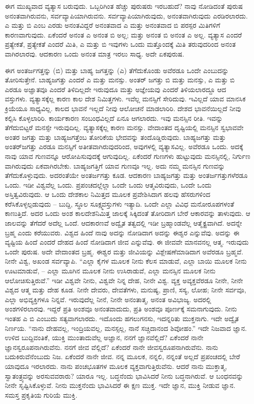 ಈಗ ಮುಖ್ಯವಾದ ವ್ಯತ್ಯಾಸ ಬರುವುದು. ಒಬ್ಬರಿಗಿಂತ ಹೆಚ್ಚು ಪುರುಷರು ಇರಬಹುದೆ? ನಾವು ನೋಡಿದಂತೆ ಪುರುಷ ಅನಂತವಾಗಿರುವನು, ಸರ್ವವ್ಯಾಪಿಯಾಗಿರುವನು. ಸರ್ವವ್ಯಾಪಿಯಾಗಿರುವುದು, ಅನಂತವಾಗಿರುವುದು ಎರಡಿರಲಾರದು. ಎ ಮತ್ತು ಬಿ ಎಂಬ ಎರಡು ಅನಂತವಿದ್ದರೆ ಅನಂತವಾದ ಎ ಮತ್ತು ಅನಂತವಾದ ಬಿ ಪರಸ್ಪರ ಮಿತಿಗಳಿಗೆ ಕಾರಣವಾಗುವುದು. ಏಕೆಂದರೆ ಅನಂತ ಎ ಅನಂತ ಬಿ ಅಲ್ಲ; ಮತ್ತು ಅನಂತ ಬಿ ಅನಂತ ಎ ಅಲ್ಲ. ವ್ಯತ್ಯಾಸ ಎಂದರೆ ಪ್ರತ್ಯೇಕತೆ, ಪ್ರತ್ಯೇಕತೆ ಎಂದರೆ ಮಿತಿ, ಎ ಮತ್ತು ಬಿ ಇವುಗಳು ಒಂದು ಮತ್ತೊಂದಕ್ಕೆ ಮಿತಿ ತರುವುದರಿಂದ ಅನಂತ ವಾಗಿರಲಾರವು. ಆದಕಾರಣ ಒಂದು ಅನಂತ ಮಾತ್ರ ಇರಲು ಸಾಧ್ಯ. ಅದೇ ಏಕಪುರುಷ.

ಈಗ ಅಂತರ್ಜಗತ್ತನ್ನು (ಬಿ) ಮತ್ತು ಬಾಹ್ಯ ಜಗತ್ತನ್ನು (ಎ) ತೆಗೆದುಕೊಂಡು ಅವೆರಡೂ ಒಂದೇ ಎಂಬುದನ್ನು ತೋರಿಸುತ್ತೇನೆ. ಬಾಹ್ಯಜಗತ್ತು ಎಂದರೆ ಎ ಮತ್ತು ಮನಸ್ಸು. ಅಂತರ್‌ ಜಗತ್ತು ಬಿ ಮತ್ತು ಮನಸ್ಸು, ಎ ಮತ್ತು ಬಿ ಎರಡೂ ಅಜ್ಞಾತವೂ ಎಂದರೆ ತಿಳಿದಿಲ್ಲದೇ ಇರುವುದೂ ಮತ್ತು ಅಜ್ಞೇಯವು ಎಂದರೆ ತಿಳಿಯಲಾರದ್ದೂ ಆದ ವಸ್ತುಗಳು. ವ್ಯತ್ಯಾಸಕ್ಕೆಲ್ಲ ಕಾರಣ ಕಾಲ ದೇಶ ನಿಮಿತ್ತಗಳು. ಇವೆಲ್ಲ ಮನಸ್ಸಿಗೆ ಸೇರಿದುವು. ಇವಿಲ್ಲದೆ ಯಾವ ಮಾನಸಿಕ ಕ್ರಿಯೆಯೂ ಸಾಧ್ಯವಿಲ್ಲ. ಕಾಲದ ಭಾವನೆ ಇಲ್ಲದೆ ನೀವು ಆಲೋಚನೆ ಮಾಡಲಾರಿರಿ. ದೇಶದ ಭಾವನೆಯಿಲ್ಲದೆ ನೀವು ಕಲ್ಪಿಸಿ ಕೊಳ್ಳಲಾರಿರಿ. ಕಾರ್ಯಕಾರಣ ಸಂಬಂಧವಿಲ್ಲದೆ ಏನೂ ಆಗಲಾರದು. ಇವು ಮನಸ್ಸಿನ ರೀತಿ. ಇವನ್ನು ತೆಗೆದುಬಿಟ್ಟರೆ ಮನಸ್ಸೇ ಇರುವುದಿಲ್ಲ. ವ್ಯತ್ಯಾಸಕ್ಕೆಲ್ಲ ಕಾರಣ ಮನಸ್ಸು. ವೇದಾಂತದ ದೃಷ್ಟಿಯಲ್ಲಿ ಮನಸ್ಸಿನ ಸ್ವಭಾವವೇ ಅಂತರ ಜಗತ್ತು ಮತ್ತು ಬಾಹ್ಯಜಗತ್ತೆಂಬ ತೋರಿಕೆಯ ಭೇದವನ್ನು ತಂದೊಡ್ಡಿರುವುದು. ಬಾಹ್ಯಜಗತ್ತು ಮತ್ತು ಅಂತರ್‌ಜಗತ್ತು ಎರಡೂ ಮನಸ್ಸಿಗೆ ಅತೀತವಾಗಿರುವುದರಿಂದ, ಅವುಗಳಲ್ಲಿ ವ್ಯತ್ಯಾಸವಿಲ್ಲ. ಅವೆರಡೂ ಒಂದು. ಅದಕ್ಕೆ ನಾವು ಯಾವ ಗುಣವನ್ನೂ ಆರೋಪಿಸುವುದಕ್ಕೆ ಆಗುವುದಿಲ್ಲ. ಏಕೆಂದರೆ ಗುಣಗಳು ಹುಟ್ಟುವುದು ಮನಸ್ಸಿನಲ್ಲಿ, ನಿರ್ಗುಣ ವಾಗಿರುವುದು ಏಕವಾಗಿರಬೇಕು. ಬಾಹ್ಯಜಗತ್ತಿಗೆ ಯಾವ ಗುಣವೂ ಇಲ್ಲ. ಅದು ನಮ್ಮ ಮನಸ್ಸಿನ ಗುಣವನ್ನು ತೆಗೆದುಕೊಳ್ಳುವುದು. ಅದರಂತೆಯೇ ಅಂತರ್ಜಗತ್ತು ಕೂಡ. ಆದಕಾರಣ ಬಾಹ್ಯಜಗತ್ತು ಮತ್ತು ಅಂತರ್ಜಗತ್ತುಗಳೆರಡೂ ಒಂದು. ಇಡೀ ವಿಶ್ವವೆಲ್ಲ ಒಂದು. ಪ್ರಪಂಚದಲ್ಲೆಲ್ಲಾ ಒಂದೇ ಒಂದು ಆತ್ಮವಿರುವುದು, ಒಂದೇ ಒಂದು ಅಸ್ತಿತ್ವವಿರುವುದು. ಆ ಒಂದು ದೇಶಕಾಲ ನಿಮಿತ್ತದ ಮೂಲಕ ಪ್ರವೇಶಿಸಿದಾಗ ಹಲವು ಹೆಸರುಗಳಿಂದ ಕರೆಸಿಕೊಳ್ಳಲ್ಪಡುವುದು – ಬುದ್ದಿ, ಸ್ಥೂಲ ಸೂಕ್ಷ್ಮವಸ್ತುಗಳು ಇತ್ಯಾದಿ. ಒಂದೇ ಎಲ್ಲಾ ವಿವಿಧ ಮನೋರೂಪಗಳಂತೆ ಕಾಣುತ್ತಿದೆ. ಅದರ ಒಂದು ಅಂಶ ಕಾಲದೇಶನಿಮಿತ್ತ ಜಾಲಕ್ಕೆ ಸಿಕ್ಕಿದಂತೆ ತೋರಿದಾಗ ಬೇರೆ ಆಕಾರವನ್ನು ತಾಳುವುದು. ಆ ಜಾಲವನ್ನು ತೆಗೆದರೆ ಅದೆಲ್ಲ ಒಂದೆ. ಆದಕಾರಣವೆ ಅದ್ವೈತ ತತ್ವದಲ್ಲಿ ಇಡೀ ಬ್ರಹ್ಮಾಂಡವೆಲ್ಲ ಆತ್ಮೈಕ್ಯವಾಗಿದೆ. ಅದನ್ನೇ ಬ್ರಹ್ಮ ಎಂದು ಕರೆಯುವರು. ವಿಶ್ವದ ಹಿಂದೆ ನಾವು ಅದನ್ನು ನೋಡಿದಾಗ ಅದನ್ನು ಈಶ್ವರ ಎನ್ನುವೆವು. ಅದನ್ನು ಈ ವ್ಯಷ್ಟಿಯ ಹಿಂದೆ ಎಂದರೆ ದೇಹದ ಹಿಂದೆ ನೋಡಿದಾಗ ಜೀವ ಎನ್ನುವೆವು. ಈ ಜೀವವೇ ಮಾನವನಲ್ಲ ಆತ್ಮ. ಇರುವುದು ಒಂದೇ ಪುರುಷ. ಅದೇ ವೇದಾಂತದ ಬ್ರಹ್ಮ. ಈಶ್ವರ ಮತ್ತು ಜೀವಿಯನ್ನು ವಿಶ್ಲೇಷಣೆಮಾಡಿದಾಗ ಅವೆರಡೂ ಬ್ರಹ್ಮವೆ. ನೀನೇ ವಿಶ್ವ, ಅಖಂಡ ಸರ್ವವ್ಯಾಪಿ. “ಎಲ್ಲಾ ಕೈಗಳ ಮೂಲಕ ನೀನು ಕೆಲಸ ಮಾಡುವೆ, ಎಲ್ಲಾ ಬಾಯಿ ಮೂಲಕ ನೀನು ಊಟಮಾಡುವೆ, – ಎಲ್ಲಾ ಮೂಗಿನ ಮೂಲಕ ನೀನು ಉಸಿರಾಡುವೆ, ಎಲ್ಲಾ ಮನಸ್ಸಿನ ಮೂಲಕ ನೀನು ಆಲೋಚಿಸುತ್ತಿರುವೆ.'' ಇಡೀ ವಿಶ್ವವೇ ನೀನು, ವಿಶ್ವವೇ ನಿನ್ನ ದೇಹ, ನೀನೇ ವಿಶ್ವ. ವ್ಯಕ್ತ ಅವ್ಯಕ್ತವೆರಡೂ ನೀನೇ, ನೀನೇ ವಿಶ್ವದ ಆತ್ಮ ಮತ್ತು ದೇಹ ಕೂಡ. ನೀನೇ ದೇವರು, ದೇವತೆಗಳು, ಮನುಷ್ಯ, ಪ್ರಾಣಿ, ಸಸ್ಯ, ಲೋಹ; ನೀನೇ ಸರ್ವವೂ, ಎಲ್ಲಾ ಅಭಿವ್ಯಕ್ತಿಗಳೂ ನಿನ್ನವೆ. ಇರುವುದೆಲ್ಲ ನೀನೆ, ನೀನೇ ಅನಂತಾತ್ಮ, ಅನಂತ ಅವಿಭಾಜ್ಯ. ಅದರಲ್ಲಿ ಅಂಶಗಳಿರಲಾರವು. ಇದ್ದರೆ ಪ್ರತಿ ಅಂಶವೂ ಅನಂತವಾದುದು, ಪ್ರತಿ ಅಂಶವೂ ಪೂರ್ಣಕ್ಕೆ ಸಮನಾಗುವುದು. ನೀನು ಇಂತಹ ಎ ಬಿ ಎಂಬುದು ಸತ್ಯವಾಗಲಾರದು. ಇದೊಂದು ಹಗಲುಗನಸು, ಇದನ್ನರಿತು ಮುಕ್ತನಾಗು. ಇದೇ ಅದ್ವೈತ ನಿರ್ಣಯ. “ನಾನು ದೇಹವಲ್ಲ, ಇಂದ್ರಿಯವಲ್ಲ, ಮನಸ್ಸಲ್ಲ, ನಾನೆ ಸಚ್ಚಿದಾನಂದ ಶಿವೋಹಂ.'' ಇದೇ ನಿಜವಾದ ಜ್ಞಾನ. ಉಳಿದ ಬುದ್ದಿವಂತಿಕೆ, ಯುಕ್ತಿ ಮುಂತಾದುವೆಲ್ಲ ಅಜ್ಞಾನ, ನನಗೆ ಜ್ಞಾನವೆಲ್ಲಿದೆ? ಏಕೆಂದರೆ ನಾನೇ ಜ್ಞಾನಸ್ವರೂಪನಾಗಿರುವೆನು. ನನಗೆ ಜೀವ ವೆಲ್ಲಿದೆ? ಏಕೆಂದರೆ ನಾನೇ ಜೀವಸ್ವರೂಪನಾಗಿರುವೆನು. ನಾನು ಬದುಕಿರುವೆನೆಂಬುದು ನಿಜ. ಏಕೆಂದರೆ ನಾನೇ ಜೀವ. ನನ್ನ ಮೂಲಕ, ನನ್ನಲಿ, ನನ್ನಂತೆ ಅಲ್ಲದೆ ಪ್ರಪಂಚದಲ್ಲಿ ಬೇರೆ ಯಾವುದೂ ಇರಲಾರದು. ನಾನು ಪಂಚಭೂತಗಳ ಮೂಲಕ ವ್ಯಕ್ತವಾಗುತ್ತಿರುವೆನು. ಆದರೆ ನಾನು ಮುಕ್ತಾತ್ಮ, ಸ್ವಾತಂತ್ರ್ಯವನ್ನು ಅರಸುವವರಾರು? ಯಾರೂ ಇಲ್ಲ. ಬದ್ಧನೆಂದು ಭಾವಿಸಿದರೆ ನೀನು ಬದ್ಧನಾಗಿರುವೆ. ಆ ಬಂಧನವನ್ನು ನೀನೇ ಸೃಷ್ಟಿಸಿಕೊಳ್ಳುವೆ. ನೀನು ಮುಕ್ತನೆಂದು ಭಾವಿಸಿದರೆ ಈ ಕ್ಷಣ ಮುಕ್ತ. ಇದೇ ಜ್ಞಾನ, ಮುಕ್ತಿ ನೀಡುವ ಜ್ಞಾನ. ಸಮಸ್ತ ಪ್ರಕೃತಿಯ ಗುರಿಯೆ ಮುಕ್ತಿ.

